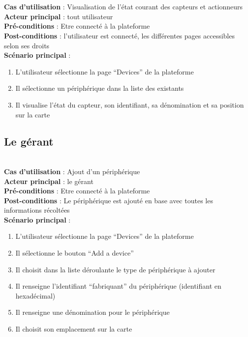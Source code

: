 \paragraph{}
~\\
\textbf{Cas d’utilisation} : Visualisation de l’état courant des capteurs et actionneurs\\
\textbf{Acteur principal} :   tout utilisateur\\
\textbf{Pré-conditions} : Etre connecté à la plateforme\\
\textbf{Post-conditions} :   l’utilisateur est connecté, les différentes pages accessibles selon ses droits\\
\textbf{Scénario principal} :
\begin{enumerate}
 \item L’utilisateur sélectionne la page “Devices” de la plateforme
 \item Il sélectionne un périphérique dans la liste des existants
 \item Il visualise l’état du capteur, son identifiant, sa dénomination et sa position sur la carte
\end{enumerate}


\subsection{Le gérant}
~\\
\textbf{Cas d’utilisation} : Ajout d’un périphérique\\
\textbf{Acteur principal} : le gérant\\
\textbf{Pré-conditions} : Etre connecté à la plateforme\\
\textbf{Post-conditions} : Le périphérique est ajouté en base avec toutes les informations récoltées\\
\textbf{Scénario principal} :
\begin{enumerate}
 \item L’utilisateur sélectionne la page “Devices” de la plateforme
 \item Il sélectionne le bouton “Add a device”
 \item Il choisit dans la liste déroulante le type de périphérique à ajouter
 \item Il renseigne l’identifiant “fabriquant” du périphérique (identifiant en hexadécimal)
 \item Il renseigne une dénomination pour le périphérique
 \item Il choisit son emplacement sur la carte
\end{enumerate}

